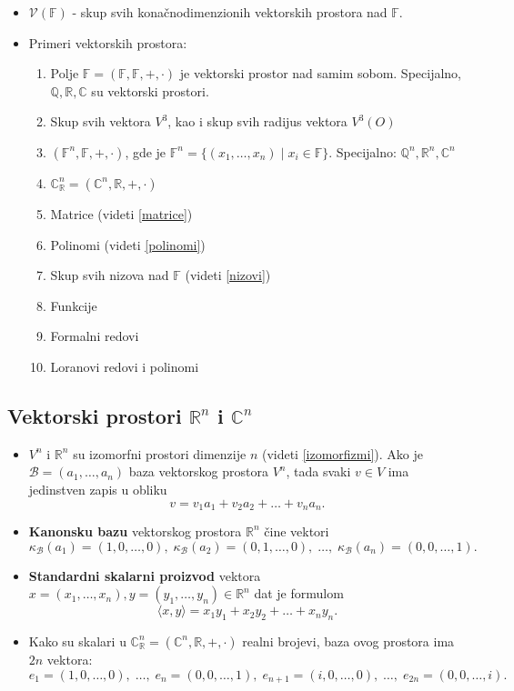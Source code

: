\documentclass[a4paper,12pt,twoside]{report}
\numberwithin{algorithm}{section}
\begin{document}
\begin{itemize}
    \item $\mathcal{V}(\mathbb{F})$ - skup svih konačnodimenzionih vektorskih prostora nad $\mathbb{F}$.
    \item Primeri vektorskih prostora:
    \begin{enumerate}
        \item Polje $\mathbb{F} = (\mathbb{F}, \mathbb{F}, +, \cdot)$ je vektorski prostor nad samim sobom. Specijalno, $\mathbb{Q, R, C}$ su vektorski prostori.
        \item Skup svih vektora $V^3$, kao i skup svih radijus vektora $V^3(O)$
        \item $(\mathbb{F}^n, \mathbb{F}, +, \cdot)$, gde je $\mathbb{F}^n = \{(x_1, \dots, x_n)\;|\;x_i \in \mathbb{F}\}$. Specijalno: $\mathbb{Q}^n, \mathbb{R}^n, \mathbb{C}^n$
        \item $\mathbb{C}^n_\mathbb{R} = (\mathbb{C}^n, \mathbb{R}, +, \cdot)$
        \item Matrice (videti \ref{matrice})
        \item Polinomi (videti \ref{polinomi})
        \item Skup svih nizova nad $\mathbb{F}$ (videti \ref{nizovi})
        \item Funkcije
        \item Formalni redovi
        \item Loranovi redovi i polinomi
    \end{enumerate}
\end{itemize}

\subsection{Vektorski prostori $\mathbb{R}^n$ i $\mathbb{C}^n$}

\begin{itemize}
    \item $V^n$ i $\mathbb{R}^n$ su izomorfni prostori dimenzije $n$ (videti \ref{izomorfizmi}). Ako je $\mathcal{B}=(a_1, \dots, a_n)$ baza vektorskog prostora 
    $V^n$, tada svaki $v \in V$ ima jedinstven zapis u obliku 
    \[ v = v_1a_1 + v_2a_2 + \dots + v_na_n. \] 
    \item \textbf{Kanonsku bazu} vektorskog prostora $\mathbb{R}^n$ čine vektori
    \[ \kappa_\mathcal{B}(a_1) = (1, 0, \dots, 0), \;\kappa_\mathcal{B}(a_2) = (0, 1, \dots, 0), \;\dots, \;\kappa_\mathcal{B}(a_n) = (0, 0, \dots, 1). \]
    \item \textbf{Standardni skalarni proizvod} vektora $x = (x_1, \dots, x_n), y = (y_1, \dots, y_n) \in \mathbb{R}^n$ dat je formulom
    \[ \langle x, y \rangle = x_1y_1 + x_2y_2 + \dots + x_ny_n. \]
    \item Kako su skalari u $\mathbb{C}^n_\mathbb{R} = (\mathbb{C}^n, \mathbb{R}, +, \cdot)$ realni brojevi, baza ovog prostora ima $2n$ vektora:
    \[ e_1 = (1, 0, \dots, 0), \; \dots, \; e_n = (0, 0, \dots, 1),\; e_{n+1} = (i, 0, \dots, 0), \;\dots,\; e_{2n} = (0, 0, \dots, i). \]
\end{itemize}\
\end{document}
